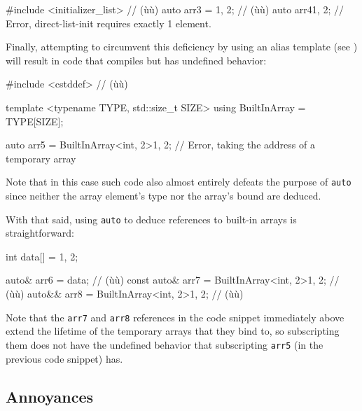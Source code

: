\begin{emcppslisting}
#include <initializer_list>  // (ù{}ù)
auto arr3 = {1, 2};  // (ù{}ù)
auto arr4{1, 2};     // Error, direct-list-init requires exactly 1 element.
\end{emcppslisting}
    
\noindent Finally, attempting to circumvent this deficiency by using an alias
template (see ) will result in code that
compiles but has undefined behavior:

\begin{emcppshiddenlisting}[emcppsbatch=e21]
#include <cstddef>  // (ù{}ù)
\end{emcppshiddenlisting}
\begin{emcppslisting}[emcppsbatch=e21]
template <typename TYPE, std::size_t SIZE>
using BuiltInArray = TYPE[SIZE];

auto arr5 = BuiltInArray<int, 2>{1, 2};
    // Error, taking the address of a temporary array
\end{emcppslisting}
    
\noindent Note that in this case such code also almost entirely defeats the
purpose of \lstinline!auto! since neither the array element's type nor the
array's bound are deduced.

With that said, using \lstinline!auto! to deduce
references to built-in arrays is straightforward:

\begin{emcppslisting}[emcppsbatch=e21]
int data[] = {1, 2};

      auto&  arr6 = data;                        //       (ù{}ù)
const auto&  arr7 = BuiltInArray<int, 2>{1, 2};  // (ù{}ù)
      auto&& arr8 = BuiltInArray<int, 2>{1, 2};  //       (ù{}ù)
\end{emcppslisting}
    
\noindent Note that the \lstinline!arr7! and \lstinline!arr8! references in the code snippet immediately above extend
the lifetime of the temporary arrays that they bind to, so subscripting
them does not have the undefined behavior that subscripting
\lstinline!arr5! (in the previous code snippet) has.

\subsection[Annoyances]{Annoyances}\label{annoyances-auto}

